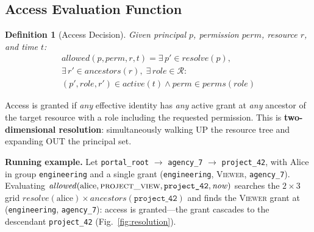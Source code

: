 \documentclass[conference]{IEEEtran}
\newtheorem{definition}{Definition}
\begin{document}
\subsection{Access Evaluation Function}

\begin{definition}[Access Decision]
Given principal $p$, permission $\mathit{perm}$, resource $r$, and time $t$:
\begin{multline*}
\mathit{allowed}(p, \mathit{perm}, r, t) = \exists\, p' \in \mathit{resolve}(p),\\
\exists\, r' \in \mathit{ancestors}(r),\; \exists\, \mathit{role} \in \mathcal{R}: \\
(p', \mathit{role}, r') \in \mathit{active}(t) \wedge \mathit{perm} \in \mathit{perms}(\mathit{role})
\end{multline*}
\end{definition}

Access is granted if \emph{any} effective identity has \emph{any} active grant at \emph{any} ancestor of the target resource with a role including the requested permission. This is \textbf{two-dimensional resolution}: simultaneously walking UP the resource tree and expanding OUT the principal set.

\textbf{Running example.} Let \texttt{portal\_root} $\to$ \texttt{agency\_7} $\to$ \texttt{project\_42}, with Alice in group \texttt{engineering} and a single grant (\texttt{engineering}, \textsc{Viewer}, \texttt{agency\_7}). Evaluating $\mathit{allowed}(\text{alice}, \textsc{project\_view}, \texttt{project\_42}, \mathit{now})$ searches the $2 \times 3$ grid $\mathit{resolve}(\text{alice}) \times \mathit{ancestors}(\texttt{project\_42})$ and finds the \textsc{Viewer} grant at (\texttt{engineering}, \texttt{agency\_7}): access is granted---the grant cascades to the descendant \texttt{project\_42} (Fig.~\ref{fig:resolution}).
\end{document}
